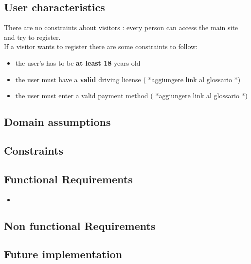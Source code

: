 \documentclass[11pt]{article}
\begin{document}
	\subsection{User characteristics}
	There are no constraints about visitors : every person can access the main site and try to register.\\If a visitor wants to register there are some constraints to follow: 
	\begin{itemize}
		\item the user's has to be \textbf{at least 18} years old
		\item the user must have a \textbf{valid} driving license ( *aggiungere link al glossario *)
		\item the user must enter a valid payment method ( *aggiungere link al glossario *)
	\end{itemize}
	
	\subsection{Domain assumptions}
	
	\subsection{Constraints}
	\subsection{Functional Requirements}

	\begin{itemize}
	 \item{}	
	\end{itemize}	
	
	\subsection{Non functional Requirements} 
	
	\subsection{Future implementation}
	 



	 	 


	 	
	
	 
     
    
     
	
\end{document}
